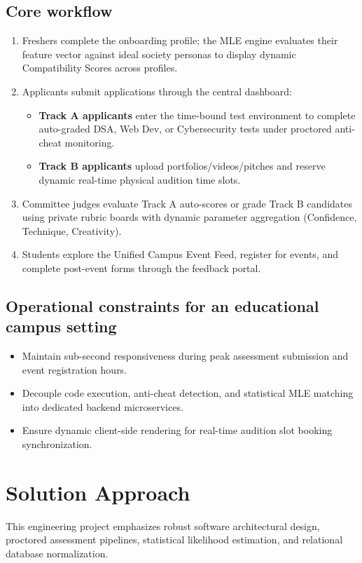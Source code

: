 \documentclass[11pt,a4paper]{article}
\begin{document}
\subsection{Core workflow}
\begin{enumerate}[leftmargin=0.7cm]
    \item Freshers complete the onboarding profile; the MLE engine evaluates their feature vector against ideal society personas to display dynamic Compatibility Scores across profiles.
    \item Applicants submit applications through the central dashboard:
    \begin{itemize}
        \item \textbf{Track A applicants} enter the time-bound test environment to complete auto-graded DSA, Web Dev, or Cybersecurity tests under proctored anti-cheat monitoring.
        \item \textbf{Track B applicants} upload portfolios/videos/pitches and reserve dynamic real-time physical audition time slots.
    \end{itemize}
    \item Committee judges evaluate Track A auto-scores or grade Track B candidates using private rubric boards with dynamic parameter aggregation (Confidence, Technique, Creativity).
    \item Students explore the Unified Campus Event Feed, register for events, and complete post-event forms through the feedback portal.
\end{enumerate}

\subsection{Operational constraints for an educational campus setting}
\begin{itemize}[leftmargin=0.7cm]
    \item Maintain sub-second responsiveness during peak assessment submission and event registration hours.
    \item Decouple code execution, anti-cheat detection, and statistical MLE matching into dedicated backend microservices.
    \item Ensure dynamic client-side rendering for real-time audition slot booking synchronization.
\end{itemize}

\section{Solution Approach}
This engineering project emphasizes robust software architectural design, proctored assessment pipelines, statistical likelihood estimation, and relational database normalization.
\end{document}
